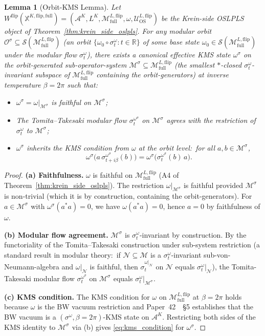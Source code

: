 \documentclass[11pt,a4paper]{article}
\theoremstyle{plain}
\newtheorem{lemma}[theorem]{Lemma}
\theoremstyle{definition}
\newcommand{\Acal}{\mathcal{A}}
\newcommand{\Scal}{\mathcal{S}}
\newcommand{\Mcal}{\mathcal{M}}
\newcommand{\Ucal}{\mathcal{U}}
\newcommand{\Ncal}{\mathcal{N}}
\newcommand{\Ocal}{\mathcal{O}}
\newcommand{\R}{\mathbb{R}}
\newcommand{\Mflipfull}{\Mcal^{L,\mathrm{flip}}_{\mathrm{full}}}
\newcommand{\Wflip}{W^{\mathrm{flip}}}
\newcommand{\osXkrein}{\mathbb{X}^{K,\mathrm{flip},\mathrm{full}}}
\newcommand{\Morb}[1]{\Mcal^{\sigma_{#1}}}
\newcommand{\Oorb}[1]{\Ocal^{\sigma_{#1}}}
\begin{document}
\begin{lemma}[Orbit-KMS Lemma]\label{lem:orbit_kms}
Let $\Wflip(\osXkrein)=(\Acal^{K},L^{K},\Mflipfull,\omega,
\Ucal^{L,\mathrm{flip}}_{\mathrm{OS}})$ be the Krein-side OSLPLS object
of Theorem~\ref{thm:krein_side_oslpls}. For any modular orbit
$\Oorb{}\subseteq\Scal(\Mflipfull)$ (an orbit
$\{\omega_{0}\circ\sigma_{t}^{\omega}:t\in\R\}$ of some base state
$\omega_{0}\in\Scal(\Mflipfull)$ under the modular flow
$\sigma_{t}^{\omega}$), there exists a canonical \emph{effective KMS
state} $\omega^{\sigma}$ on the orbit-generated sub-operator-system
$\Morb{}\subseteq\Mflipfull$ (the smallest $*$-closed
$\sigma_{t}^{\omega}$-invariant subspace of $\Mflipfull$ containing
the orbit-generators) at inverse temperature $\beta=2\pi$ such that:
\begin{itemize}
\item[(a)] $\omega^{\sigma}=\omega|_{\Morb{}}$ is faithful on
$\Morb{}$;
\item[(b)] The Tomita--Takesaki modular flow
$\sigma_{t}^{\omega^{\sigma}}$ on $\Morb{}$ agrees with the restriction
of $\sigma_{t}^{\omega}$ to $\Morb{}$;
\item[(c)] $\omega^{\sigma}$ inherits the KMS condition from
$\omega$ at the orbit level:\ for all $a,b\in\Morb{}$,
\begin{equation}
  \omega^{\sigma}\!\big(a\,\sigma_{t+i\beta}^{\omega^{\sigma}}(b)\big) = \omega^{\sigma}\!\big(\sigma_{t}^{\omega^{\sigma}}(b)\,a\big).
  \label{eq:kms_condition}
\end{equation}
\end{itemize}
\end{lemma}

\begin{proof}
\textbf{(a) Faithfulness.} $\omega$ is faithful on $\Mflipfull$ (A4
of Theorem~\ref{thm:krein_side_oslpls}). The restriction
$\omega|_{\Morb{}}$ is faithful provided $\Morb{}$ is non-trivial
(which it is by construction, containing the orbit-generators). For
$a\in\Morb{}$ with $\omega^{\sigma}(a^{*}a)=0$, we have
$\omega(a^{*}a)=0$, hence $a=0$ by faithfulness of $\omega$.

\textbf{(b) Modular flow agreement.} $\Morb{}$ is
$\sigma_{t}^{\omega}$-invariant by construction. By the functoriality
of the Tomita--Takesaki construction under sub-system restriction
(a standard result in modular theory:\ if $\Ncal\subseteq\Mcal$ is a
$\sigma_{t}^{\omega}$-invariant sub-von-Neumann-algebra and
$\omega|_{\Ncal}$ is faithful, then $\sigma_{t}^{\omega|_{\Ncal}}$
on $\Ncal$ equals $\sigma_{t}^{\omega}|_{\Ncal}$), the Tomita-Takesaki
modular flow $\sigma_{t}^{\omega^{\sigma}}$ on $\Morb{}$ equals
$\sigma_{t}^{\omega}|_{\Morb{}}$.

\textbf{(c) KMS condition.} The KMS condition for $\omega$ on
$\Mflipfull$ at $\beta=2\pi$ holds because $\omega$ is the BW vacuum
restriction and Paper~42~\cite{paper42}~\S 5 establishes that the BW
vacuum is a $(\sigma^{\omega},\beta=2\pi)$-KMS state on $\Acal^{K}$.
Restricting both sides of the KMS identity to $\Morb{}$ via (b)
gives \eqref{eq:kms_condition} for $\omega^{\sigma}$.
\end{proof}
\end{document}
